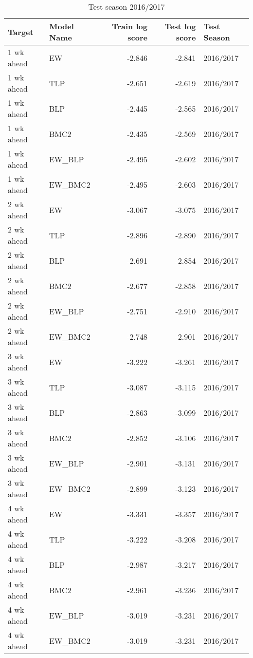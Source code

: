 \documentclass[
]{article}
\begin{document}
\begin{table}[H]

\caption{\label{tab:unnamed-chunk-6}Test season 2016/2017}
\centering
\begin{tabular}[t]{llrrl}
\toprule
Target & Model Name & Train log score & Test log score & Test Season\\
\midrule
1 wk ahead & EW & -2.846 & -2.841 & 2016/2017\\
1 wk ahead & TLP & -2.651 & -2.619 & 2016/2017\\
1 wk ahead & BLP & -2.445 & -2.565 & 2016/2017\\
1 wk ahead & BMC2 & -2.435 & -2.569 & 2016/2017\\
1 wk ahead & EW\_BLP & -2.495 & -2.602 & 2016/2017\\
1 wk ahead & EW\_BMC2 & -2.495 & -2.603 & 2016/2017\\
2 wk ahead & EW & -3.067 & -3.075 & 2016/2017\\
2 wk ahead & TLP & -2.896 & -2.890 & 2016/2017\\
2 wk ahead & BLP & -2.691 & -2.854 & 2016/2017\\
2 wk ahead & BMC2 & -2.677 & -2.858 & 2016/2017\\
2 wk ahead & EW\_BLP & -2.751 & -2.910 & 2016/2017\\
2 wk ahead & EW\_BMC2 & -2.748 & -2.901 & 2016/2017\\
3 wk ahead & EW & -3.222 & -3.261 & 2016/2017\\
3 wk ahead & TLP & -3.087 & -3.115 & 2016/2017\\
3 wk ahead & BLP & -2.863 & -3.099 & 2016/2017\\
3 wk ahead & BMC2 & -2.852 & -3.106 & 2016/2017\\
3 wk ahead & EW\_BLP & -2.901 & -3.131 & 2016/2017\\
3 wk ahead & EW\_BMC2 & -2.899 & -3.123 & 2016/2017\\
4 wk ahead & EW & -3.331 & -3.357 & 2016/2017\\
4 wk ahead & TLP & -3.222 & -3.208 & 2016/2017\\
4 wk ahead & BLP & -2.987 & -3.217 & 2016/2017\\
4 wk ahead & BMC2 & -2.961 & -3.236 & 2016/2017\\
4 wk ahead & EW\_BLP & -3.019 & -3.231 & 2016/2017\\
4 wk ahead & EW\_BMC2 & -3.019 & -3.231 & 2016/2017\\
\bottomrule
\end{tabular}
\end{table}
\end{document}
